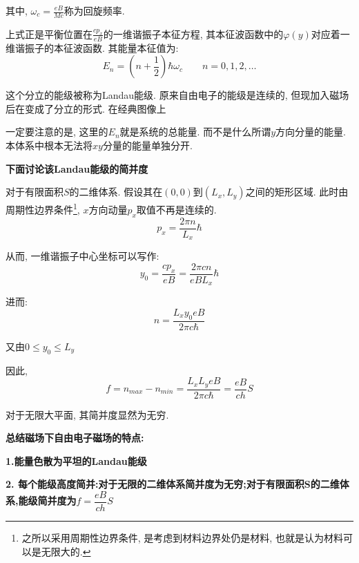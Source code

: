 \documentclass[a4paper, 11pt]{article}
\begin{document}
\begin{spacing}{1.2}
        其中, $\omega_c=\frac{eB}{Mc}$称为回旋频率.

        上式正是平衡位置在$\frac{cp_x}{eB}$的一维谐振子本征方程, 其本征波函数中的$\varphi(y)$对应着一维谐振子的本征波函数.
        其能量本征值为:
        \begin{equation}
          E_n = \left(n+\dfrac{1}{2}\right)\hbar\omega_c\qquad{}n=0,1,2,\ldots 
        \end{equation}

        这个分立的能级被称为Landau能级. 原来自由电子的能级是连续的, 但现加入磁场后在变成了分立的形式.
        在经典图像上

        一定要注意的是, 这里的$E_n$就是系统的总能量. 而不是什么所谓$y$方向分量的能量. 本体系中根本无法将$xy$分量的能量单独分开.

        \textbf{下面讨论该Landau能级的简并度}

        对于有限面积$S$的二维体系. 假设其在$(0,0)$到$(L_x,L_y)$之间的矩形区域. 此时由周期性边界条件\footnote{之所以采用周期性边界条件,
        是考虑到材料边界处仍是材料, 也就是认为材料可以是无限大的.}, 
        $x$方向动量$p_x$取值不再是连续的.
        \begin{equation}
          p_x = \dfrac{2\pi{}n}{L_x}\hbar
        \end{equation}

        从而, 一维谐振子中心坐标可以写作: 
        \begin{equation}
          y_0 = \dfrac{cp_x}{eB} = \dfrac{2\pi{}cn}{eBL_x}\hbar
        \end{equation}

        进而:
        \begin{equation}
          n = \dfrac{L_xy_0eB}{2\pi{}c\hbar}
        \end{equation}

        又由$0\leq{}y_0\leq{}L_y$

        因此,
        \begin{equation}
          f = n_{max}-n_{min} = \dfrac{L_xL_yeB}{2\pi{}c\hbar} = \dfrac{eB}{ch}S
        \end{equation}

        对于无限大平面, 其简并度显然为无穷.

        \textbf{总结磁场下自由电子磁场的特点:}

        \textbf{1.能量色散为平坦的Landau能级}

        \textbf{2. 每个能级高度简并:对于无限的二维体系简并度为无穷;对于有限面积S的二维体系,能级简并度为$f=\dfrac{eB}{ch}S$}


\end{spacing}
\end{document}
